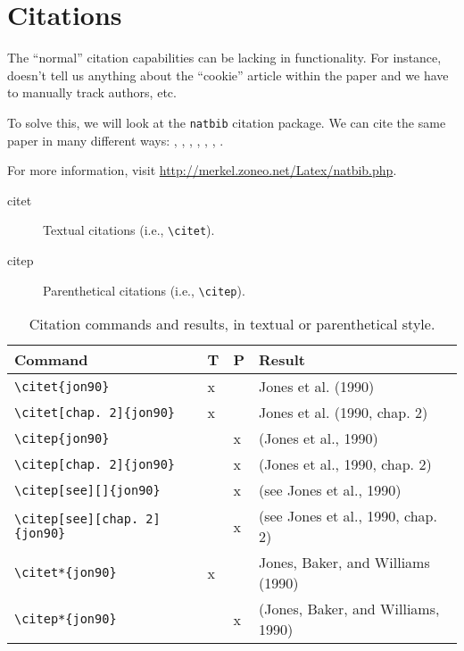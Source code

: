 \chapter{Citations}
\label{sec:CITATIONS}

The ``normal'' citation capabilities can be lacking in functionality.
For instance, \cite[TEST]{COOKIE} doesn't tell us anything about the
``cookie'' article within the paper and we have to manually track
authors, etc.

To solve this, we will look at the \verb|natbib| citation package.  We
can cite the same paper in many different ways: \citet{1188581},
\cite{1188581}, \citep[see][]{1188581}, \citep[see][chapter
1]{1188581}, \citep[chapter 1]{1188581}, \citealt{1188581},
\citealt*{1188581}.
			
\smallskip
For more information, visit
\href{http://merkel.zoneo.net/Latex/natbib.php}{http://merkel.zoneo.net/Latex/natbib.php}.

\begin{centering}
    \begin{description}
	\item[citet] Textual citations (i.e., \verb|\citet|).
	\item[citep] Parenthetical citations (i.e., \verb|\citep|).
    \end{description}
\end{centering}

\begin{table}[ht]
    \footnotesize
    \centering
    \caption{Citation commands and results, in textual or parenthetical style.}
    \begin{tabular}[ht]{llll}
	\hline
	Command & T & P & Result \\
	\hline
	\verb|\citet{jon90}| & x &   & Jones et al. (1990) \\
	\verb|\citet[chap. 2]{jon90}| & x & & Jones et al. (1990, chap. 2)\\
	\verb|\citep{jon90}| & & x &(Jones et al., 1990)\\
	\verb|\citep[chap. 2]{jon90}| & & x &(Jones et al., 1990, chap. 2)\\
	\verb|\citep[see][]{jon90}| & & x &(see Jones et al., 1990)\\
	\verb|\citep[see][chap. 2]{jon90}| & & x &(see Jones et al.,
		1990, chap. 2)\\ 
	\verb|\citet*{jon90}| & x & &Jones, Baker, and Williams (1990)\\
	\verb|\citep*{jon90}| & & x &(Jones, Baker, and Williams, 1990)\\
	\hline
    \end{tabular}
\end{table}

